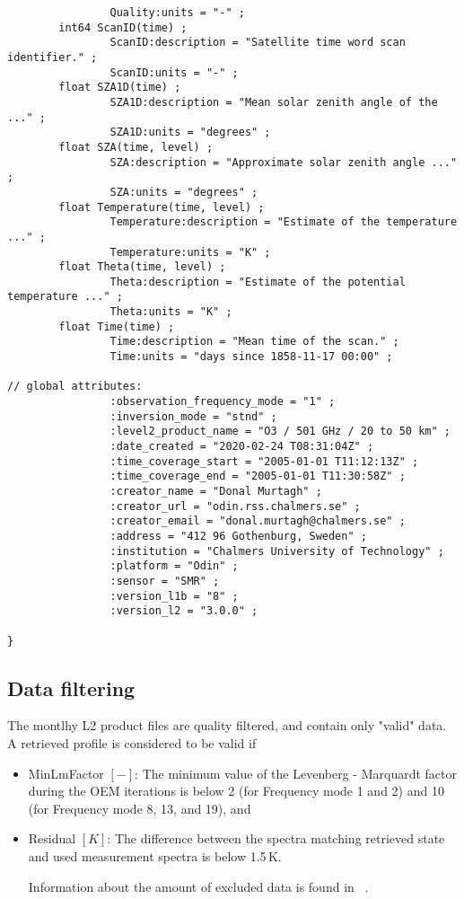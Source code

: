 \begin{verbatim}
                Quality:units = "-" ;
        int64 ScanID(time) ;
                ScanID:description = "Satellite time word scan identifier." ;
                ScanID:units = "-" ;
        float SZA1D(time) ;
                SZA1D:description = "Mean solar zenith angle of the ..." ;
                SZA1D:units = "degrees" ;
        float SZA(time, level) ;
                SZA:description = "Approximate solar zenith angle ..." ;
                SZA:units = "degrees" ;
        float Temperature(time, level) ;
                Temperature:description = "Estimate of the temperature ..." ;
                Temperature:units = "K" ;
        float Theta(time, level) ;
                Theta:description = "Estimate of the potential temperature ..." ;
                Theta:units = "K" ;
        float Time(time) ;
                Time:description = "Mean time of the scan." ;
                Time:units = "days since 1858-11-17 00:00" ;

// global attributes:
                :observation_frequency_mode = "1" ;
                :inversion_mode = "stnd" ;
                :level2_product_name = "O3 / 501 GHz / 20 to 50 km" ;
                :date_created = "2020-02-24 T08:31:04Z" ;
                :time_coverage_start = "2005-01-01 T11:12:13Z" ;
                :time_coverage_end = "2005-01-01 T11:30:58Z" ;
                :creator_name = "Donal Murtagh" ;
                :creator_url = "odin.rss.chalmers.se" ;
                :creator_email = "donal.murtagh@chalmers.se" ;
                :address = "412 96 Gothenburg, Sweden" ;
                :institution = "Chalmers University of Technology" ;
                :platform = "Odin" ;
                :sensor = "SMR" ;
                :version_l1b = "8" ;
                :version_l2 = "3.0.0" ;

}
\end{verbatim}


\subsection{Data filtering}
\label{sec:data_filtering}

The montlhy L2 product files are quality filtered, and contain only "valid" data. A retrieved profile
is considered to be valid if 
\begin{itemize}

  \item MinLmFactor \([-]\): The minimum value of the Levenberg - Marquardt factor during the OEM iterations
  is below 2 (for Frequency mode 1 and 2) and 10 (for Frequency mode 8, 13, and 19), and

  \item Residual \([K]\):  The difference between the spectra matching retrieved state and
   used measurement spectra is below 1.5\,K.

Information about the amount of excluded data is found in ~\cite{cadl2data}.
\end{itemize}



